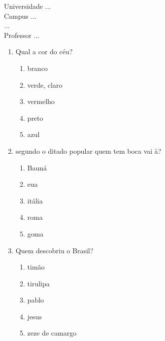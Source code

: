 \documentclass[10pt,a4paper,twocolumn]{report}
\begin{document}
\begin{flushleft}
Universidade ...\\
Campus ...\\
...\\
Professor ...\\
\end{flushleft}




 \begin{enumerate} 
    \item  Qual a cor do céu?





    \begin{enumerate}
    \item  branco

\item  verde, claro

\item  vermelho

\item  preto

\item  azul


    \end{enumerate} 
    \item  segundo o ditado popular quem tem boca vai à?





    \begin{enumerate}
    \item  Bauná

\item  eua

\item  itália

\item  roma

\item  goma


    \end{enumerate} 
    \item  Quem descobriu o Brasil?





    \begin{enumerate}
    \item  timão

\item  tirulipa

\item  pablo

\item  jesus

\item  zeze de camargo


    \end{enumerate}\end{enumerate} 
\end{document}
